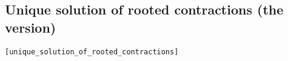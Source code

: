 \subsection{Unique solution of rooted contractions (the \multivariate version)}

\begin{alltt}
\HOLTokenTurnstile{}    \HOLSymConst{\HOLTokenConj{}}    \HOLSymConst{\HOLTokenConj{}}
    \HOLSymConst{\HOLTokenIn{}}     \HOLSymConst{\HOLTokenConj{}}
    \HOLSymConst{\HOLTokenIn{}}     \HOLSymConst{\HOLTokenImp{}}
    \HOLSymConst{\HOLTokenObsCongr} \hfill{[unique_solution_of_rooted_contractions]}
\end{alltt}
